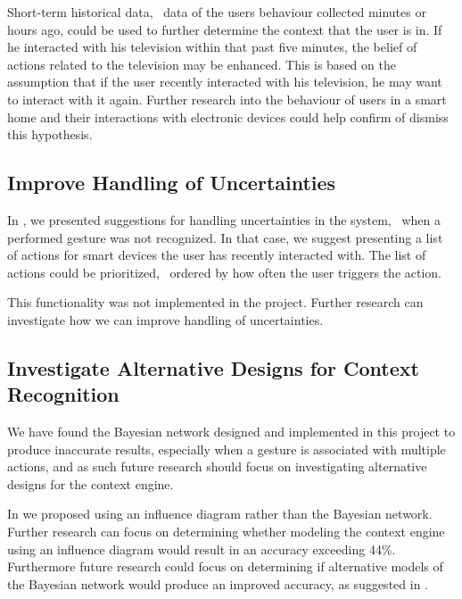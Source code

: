 Short-term historical data, \ie~data of the users behaviour collected minutes or hours ago, could be used to further determine the context that the user is in. If he interacted with his television within that past five minutes, the belief of actions related to the television may be enhanced. This is based on the assumption that if the user recently interacted with his television, he may want to interact with it again. Further research into the behaviour of users in a smart home and their interactions with electronic devices could help confirm of dismiss this hypothesis.

\subsection{Improve Handling of Uncertainties}

In , we presented suggestions for handling uncertainties in the system, \eg~when a performed gesture was not recognized. In that case, we suggest presenting a list of actions for smart devices the user has recently interacted with.
The list of actions could be prioritized, \eg~ordered by how often the user triggers the action.

This functionality was not implemented in the project. Further research can investigate how we can improve handling of uncertainties.

\subsection{Investigate Alternative Designs for Context Recognition}

We have found the Bayesian network designed and implemented in this project to produce inaccurate results, especially when a gesture is associated with multiple actions, and as such future research should focus on investigating alternative designs for the context engine.

In  we proposed using an influence diagram rather than the Bayesian network. Further research can focus on determining whether modeling the context engine using an influence diagram would result in an accuracy exceeding 44\%. Furthermore future research could focus on determining if alternative models of the Bayesian network would produce an improved accuracy, as suggested in .

